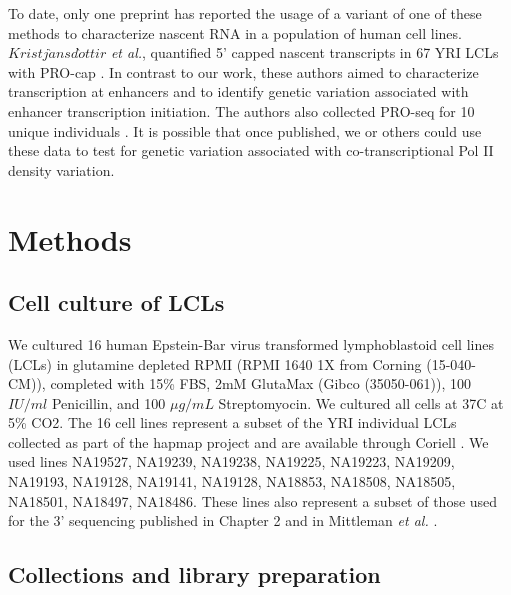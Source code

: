 To date, only one preprint has reported the usage of a variant of one of these methods to characterize nascent RNA in a population of human cell lines. $Kristj\grave{a}nsd\grave{o}ttir$ \emph{et al.}, quantified 5' capped nascent transcripts in 67 YRI LCLs with PRO-cap \citep{kristjansdottir_population-scale_2018}. In contrast to our work, these authors aimed to characterize transcription at enhancers and to identify genetic variation associated with enhancer transcription initiation. The authors also collected PRO-seq for 10 unique individuals \citep{kristjansdottir_population-scale_2018}. It is possible that once published, we or others could use these data to test for genetic variation associated with co-transcriptional Pol II density variation. 


\section{Methods}\label{ch04-methods}



\subsection{Cell culture of LCLs}\label{cell-culture-of-LCLs} 

We cultured 16 human Epstein-Bar virus transformed lymphoblastoid cell lines (LCLs) in glutamine depleted RPMI (RPMI 1640 1X from Corning (15-040-CM)), completed with 15\% FBS, 2mM GlutaMax (Gibco (35050-061)), 100 $IU/ml$ Penicillin, and 100 $\mu g/mL$ Streptomyocin. We cultured all cells at 37C at 5\% CO2. The 16 cell lines represent a subset of the YRI individual LCLs collected as part of the hapmap project and are available through Coriell \citep{HapMap2005}. 
We used lines NA19527, NA19239, NA19238, NA19225, NA19223, NA19209, NA19193, NA19128, NA19141, NA19128, NA18853, NA18508, NA18505, NA18501, NA18497, NA18486. These lines also represent a subset of those used for the 3' sequencing published in Chapter 2 and in Mittleman \emph{et al.} \citep{mittleman_alternative_2020}. 


\subsection{Collections and library preparation}\label{Collections-and-library-preparation}

